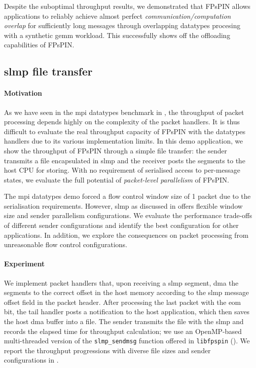 Despite the suboptimal throughput results, we demonstrated that FPsPIN allows applications to reliably achieve almost perfect \emph{communication/computation overlap} for sufficiently long messages through overlapping datatypes procesing with a synthetic \ac{gemm} workload.  This successfully shows off the offloading capabilities of FPsPIN.

\subsection{\acs{slmp} file transfer} \label{sec:slmp-demo}

\paragraph{Motivation} As we have seen in the \ac{mpi} datatypes benchmark in , the throughput of packet processing depends highly on the complexity of the packet handlers.  It is thus difficult to evaluate the real throughput capacity of FPsPIN with the datatypes handlers due to its various implementation limits.  In this demo application, we show the throughput of FPsPIN through a simple file transfer: the sender transmits a file encapsulated in \ac{slmp} and the receiver posts the segments to the host CPU for storing.  With no requirement of serialised access to per-message states, we evaluate the full potential of \emph{packet-level parallelism} of FPsPIN.

The \ac{mpi} datatypes demo forced a flow control window size of 1 packet due to the serialisation requirements.  However, \ac{slmp} as discussed in  offers flexible window size and sender parallelism configurations.  We evaluate the performance trade-offs of different sender configurations and identify the best configuration for other applications.  In addition, we explore the consequences on packet processing from unreasonable flow control configurations.

\paragraph{Experiment} We implement packet handlers that, upon receiving a \ac{slmp} segment, \ac{dma} the segments to the correct offset in the host memory according to the \ac{slmp} message offset field in the packet header.  After processing the last packet with the \ac{eom} bit, the tail handler posts a notification to the host application, which then saves the host \ac{dma} buffer into a file.  The sender transmits the file with the \ac{slmp} and records the elapsed time for throughput calculation; we use an OpenMP-based multi-threaded version of the \texttt{slmp\_sendmsg} function offered in \texttt{libfpspin} ().  We report the throughput progressions with diverse file sizes and sender configurations in .

